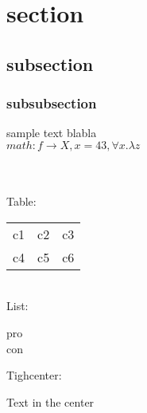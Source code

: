 \begin{comment}
	\pagebreak
\end{comment}

\section{section}
\subsection{subsection}
\subsubsection{subsubsection}

sample text blabla\\

$math: f \rightarrow X, x=43, \forall x.\lambda z$\\

\begin{comment}
	comment\\
\end{comment}

\\

\\

Table:\\
\begin{tabular}{c c c}
	c1 & c2 & c3\\
	c4 & c5 & c6
\end{tabular}\\

List:\\
\begin{itemize}
	\pro pro\\
	\con con
\end{itemize}

Tighcenter:\\
\begin{tightcenter}
	Text in the center
\end{tightcenter}

\\
\\
\\
\\
\\

